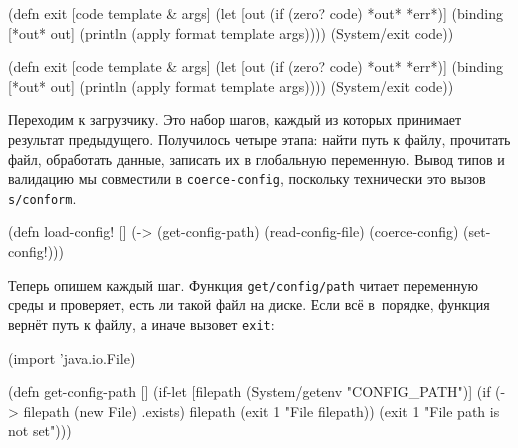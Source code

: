 \ifnarrow

\begin{english}
  \begin{clojure}
(defn exit
  [code template & args]
  (let [out (if (zero? code)
              *out*
              *err*)]
    (binding [*out* out]
      (println (apply format
        template args))))
  (System/exit code))
  \end{clojure}
\end{english}

\else

\begin{english}
  \begin{clojure}
(defn exit
  [code template & args]
  (let [out (if (zero? code) *out* *err*)]
    (binding [*out* out]
      (println (apply format template args))))
  (System/exit code))
  \end{clojure}
\end{english}

\fi

Переходим к загрузчику. Это набор шагов, каждый из которых принимает результат
предыдущего. Получилось четыре этапа: найти путь к файлу, прочитать файл,
обработать данные, записать их в глобальную переменную. Вывод типов и валидацию
мы совместили в \verb|coerce-config|, поскольку технически это вызов
\verb|s/conform|.


\begin{english}
  \begin{clojure}
(defn load-config!
  []
  (-> (get-config-path)
      (read-config-file)
      (coerce-config)
      (set-config!)))
  \end{clojure}
\end{english}

Теперь опишем каждый шаг. Функция \texttt{get\-/config\-/path} читает переменную
среды и проверяет, есть ли такой файл на диске. Если всё в~порядке, функция
вернёт путь к файлу, а иначе вызовет \verb|exit|:


\pagebreaklarge

\ifnarrow

\begin{english}
  \begin{clojure}
(import 'java.io.File)

(defn get-config-path []
  (if-let [filepath (System/getenv
                      "CONFIG_PATH")]
    (if (-> filepath (new File) .exists)
      filepath
      (exit 1 "File %
        filepath))
    (exit 1 "File path is not set")))
  \end{clojure}
\end{english}

